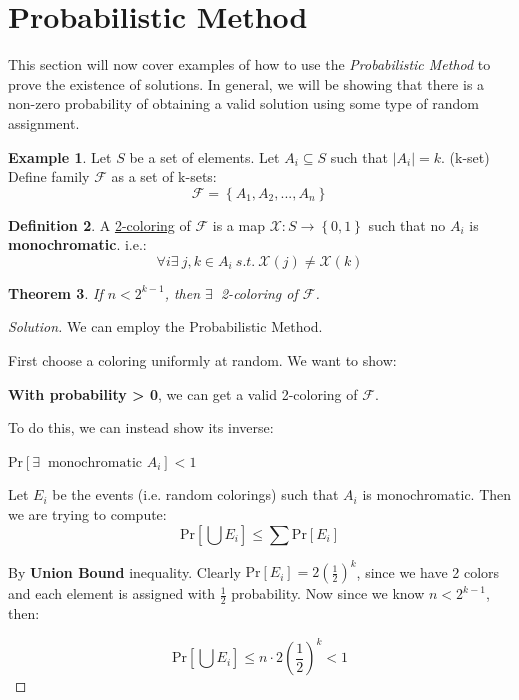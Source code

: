 \documentclass[psamsfonts, 12pt]{amsart}
\newtheorem{thm}{Theorem}[section]
\theoremstyle{definition}
\newtheorem{defn}[thm]{Definition}
\newtheorem{exmp}[thm]{Example}
\theoremstyle{remark}
\let\oldexists\exists
\renewcommand\exists{\oldexists~}
\newenvironment{solution}
  {\begin{proof}[Solution]}
  {\end{proof}}
\begin{document}
\section{Probabilistic Method}

This section will now cover examples of how to use the \textit{Probabilistic Method} to prove the existence of solutions. In general, we will be showing that there is a non-zero probability of obtaining a valid solution using some type of random assignment.

\begin{exmp}
Let $S$ be a set of elements. Let $A_i \subseteq S$ such that $|A_i|=k$. (k-set)
\\
Define family $\mathcal{F}$ as a set of k-sets:
\[
\mathcal{F} = \left\lbrace A_1,A_2,...,A_n \right\rbrace
\]
\end{exmp}

\begin{defn}
A \underline{2-coloring} of $\mathcal{F}$ is a map $\mathcal{X}: S\rightarrow \left\lbrace 0,1 \right\rbrace$ such that no $A_i$ is \textbf{monochromatic}. i.e.:
\[
\forall i \exists j,k \in A_i\ s.t.\ \mathcal{X}(j) \neq \mathcal{X}(k)
\]
\end{defn}

\begin{thm}
If $n < 2^{k-1}$, then $\exists$ 2-coloring of $\mathcal{F}$.
\end{thm}

\begin{solution}
We can employ the Probabilistic Method.
\vspace{0.5em}

First choose a coloring uniformly at random. We want to show:

\begin{center}
\textbf{With probability > 0}, we can get a valid 2-coloring of $\mathcal{F}$.
\end{center}

To do this, we can instead show its inverse:

\begin{center}
Pr$\left[ \exists \text{ monochromatic } A_i \right] < 1$
\end{center}

Let $E_i$ be the events (i.e. random colorings) such that $A_i$ is monochromatic. Then we are trying to compute:
\[
\text{Pr}\left[ \bigcup E_i \right] \leq \sum \text{Pr}\left[ E_i \right]
\]

By \textbf{Union Bound} inequality. Clearly $\text{Pr}\left[ E_i \right] = 2(\frac{1}{2})^k$, since we have 2 colors and each element is assigned with $\frac{1}{2}$ probability. Now since we know $n < 2^{k-1}$, then:

\[
\text{Pr}\left[ \bigcup E_i \right] \leq n \cdot 2(\frac{1}{2})^k < 1
\]
\end{solution}
\end{document}
